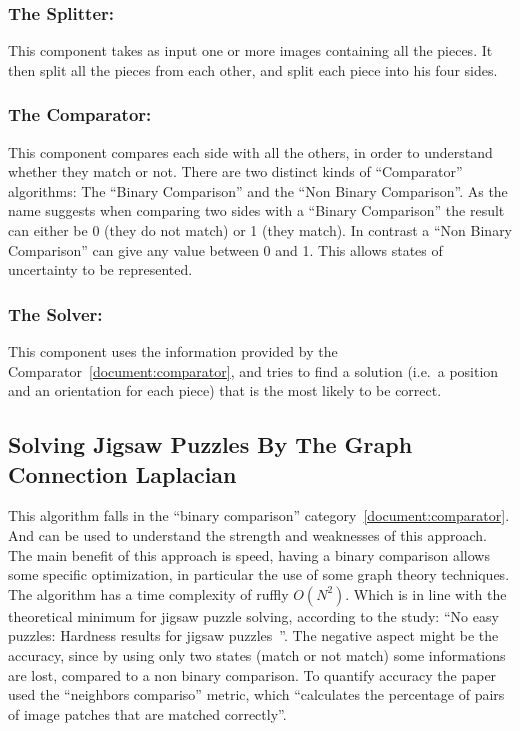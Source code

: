 \documentclass{article}
\newenvironment{indented_section}
  {\adjustwidth{3em}{0pt}}
  {\endadjustwidth}
\begin{document}
\begin{indented_section}

    \subsubsection{The Splitter:} This component takes as input one or more images
    containing all the pieces. It then split all the pieces from each other,
    and split each piece into his four sides.\label{document:splitter}

    \subsubsection{The Comparator:} This component compares each side with all the
    others, in order to understand whether they match or not.\newline
    There are two distinct kinds of “Comparator” algorithms:
    The “Binary Comparison” and the “Non Binary Comparison”.
    As the name suggests when comparing two sides with a “Binary Comparison”
    the result can either be 0 (they do not match) or 1 (they match).
    In contrast a “Non Binary Comparison” can give any value between 0 and 1.
    This allows states of uncertainty to be represented.\label{document:comparator}

    \subsubsection{The Solver:} This component  uses the information provided by the
    Comparator~\ref{document:comparator}, and tries to find a solution
    (i.e.\ a position and an orientation for each piece)
    that is the most likely to be correct.\label{document:solver}

\end{indented_section}

\subsection{Solving Jigsaw Puzzles By The Graph Connection Laplacian~\cite{GCL}}
This algorithm falls in the ``binary comparison'' category~\cref{document:comparator}.
And can be used to understand the strength and weaknesses
of this approach.\newline
The main benefit of this approach is speed,  having a binary comparison allows
some specific optimization, in particular the use of some graph theory techniques.\newline
The  algorithm has a time complexity of ruffly \(O(N^2)\). Which is in line with the theoretical
minimum for jigsaw puzzle solving, according to the study:
``No easy puzzles: Hardness results for jigsaw puzzles~\cite{ON2Claim}''.\newline
The negative aspect might be the accuracy, since by using only two states
(match or not match) some informations are lost, compared to a non binary comparison.
To quantify accuracy the paper used the ``neighbors compariso'' metric,
which ``calculates the percentage of pairs of image patches that are matched correctly''.\label{document:GCL}
\end{document}
